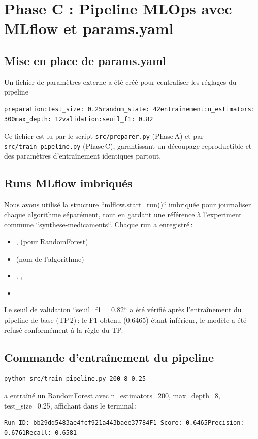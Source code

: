 \documentclass[12pt,a4paper]{report}
\begin{document}
\chapter*{Phase C : Pipeline MLOps avec MLflow et params.yaml}

\section{Mise en place de params.yaml}
Un fichier de paramètres externe a été créé pour centraliser les réglages du pipeline\begin{verbatim}
preparation:test_size: 0.25random_state: 42entrainement:n_estimators: 300max_depth: 12validation:seuil_f1: 0.82
\end{verbatim}

Ce fichier est lu par le script \texttt{src/preparer.py} (Phase A) et par \texttt{src/train\_pipeline.py} (Phase C), garantissant un découpage reproductible et des paramètres d'entraînement identiques partout.

\section{Runs MLflow imbriqués}
Nous avons utilisé la structure ``mlflow.start\_run()`` imbriquée pour journaliser chaque algorithme séparément, tout en gardant une référence à l'experiment commune ``synthese-medicaments``. Chaque run a enregistré :
\begin{itemize}
    \item {},  (pour RandomForest)
    \item {} (nom de l'algorithme)
    \item {}, , 
    \item {}
\end{itemize}

Le seuil de validation ``seuil\_f1 = 0.82`` a été vérifié après l'entraînement du pipeline de base (TP 2) : le F1 obtenu (0.6465) étant inférieur, le modèle a été refusé conformément à la règle du TP.

\section{Commande d'entraînement du pipeline}
\begin{verbatim}
python src/train_pipeline.py 200 8 0.25
\end{verbatim}
a entraîné un RandomForest avec n\_estimators=200, max\_depth=8, test\_size=0.25, affichant dans le terminal :
\begin{verbatim}Run ID: bb29dd5483ae4fcf921a443baee37784F1 Score: 0.6465Precision: 0.6761Recall: 0.6581\end{verbatim}
\end{document}
